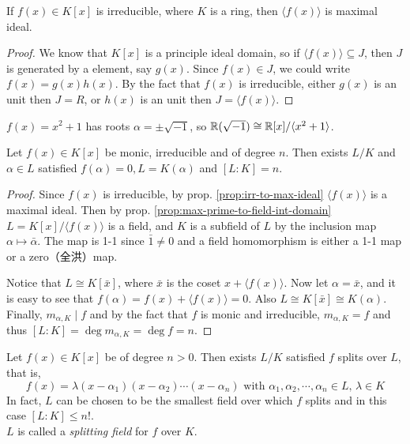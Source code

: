 \begin{prop} \label{prop:irr-to-max-ideal}
  If $f(x) \in K[x]$ is irreducible, where $K$ is a ring, then $\langle f(x) \rangle$ is maximal ideal.
  \begin{proof}
    We know that $K[x]$ is a principle ideal domain, so if $\langle f(x) \rangle \subseteq J$, then
    $J$ is generated by a element, say $g(x)$. Since $f(x) \in J$, we could write $f(x) = g(x) h(x)$.
    By the fact that $f(x)$ is irreducible, either $g(x)$ is an unit then $J = R$, or $h(x)$ is
    an unit then $J = \langle f(x) \rangle$.
  \end{proof}
\end{prop}

\begin{example}
  $f(x) = x^2 + 1$ has roots $\alpha = \pm \sqrt{-1}$, so $\mathbb{R}(\sqrt{-1}) \cong \mathbb{R}[x] / \langle x^2 + 1 \rangle$.
\end{example}

\begin{theorem} \label{thm:field-ext-1}
  Let $f(x) \in K[x]$ be monic, irreducible and of degree $n$. Then exists $L / K$ and $\alpha \in L$
  satisfied $f(\alpha) = 0, L = K(\alpha)$ and $[L: K] = n$.
\end{theorem}

\begin{proof}
  Since $f(x)$ is irreducible, by prop. \ref{prop:irr-to-max-ideal} $\langle f(x) \rangle$ is a maximal ideal.
  Then by prop. \ref{prop:max-prime-to-field-int-domain} $L = K[x] / \langle f(x) \rangle$ is a field, and $K$ is a subfield
  of $L$ by the inclusion map $\alpha \mapsto \bar\alpha$. The map is 1-1 since $\bar{1} \neq 0$ and
  a field homomorphism is either a 1-1 map or a zero（全洪）map.

  Notice that $L \cong K[\bar{x}]$, where $\bar{x}$ is the coset $x + \langle f(x) \rangle$.
  Now let $\alpha = \bar{x}$, and it is easy to see that $f(\alpha) = f(x) + \langle f(x) \rangle = 0$.
  Also $L \cong K[\bar{x}] \cong K(\alpha)$. Finally, $m_{\alpha, K} \mid f$ and by the fact that
  $f$ is monic and irreducible, $m_{\alpha, K} = f$ and thus $[L: K] = \deg m_{\alpha, K} = \deg f = n$.
\end{proof}

\begin{theorem}
  Let $f(x) \in K[x]$ be of degree $n > 0$. Then exists $L/K$ satisfied $f$ splits over $L$,
  that is,
  \[ f(x) = \lambda (x - \alpha_1) (x - \alpha_2) \cdots (x - \alpha_n) \text{ with }
    \alpha_1, \alpha_2, \cdots, \alpha_n \in L,\, \lambda \in K \]
  In fact, $L$ can be chosen to be the smallest field over which $f$ splits and in this case $[L : K] \leq n!$.\\
  $L$ is called a \emph{splitting field}  for $f$ over $K$.
\end{theorem}

